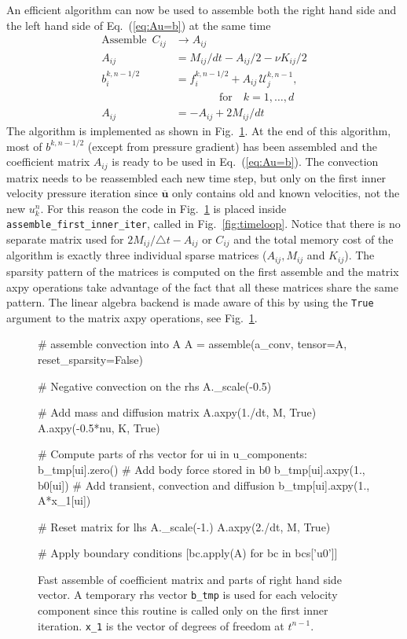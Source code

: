 \documentclass[final,3p,times,twocolumn]{elsarticle}
\newcommand{\inpyth}{\lstinline[style=inlinestyle]} %[]%
\begin{document}
An efficient algorithm can now be used to assemble both the right hand side and the left hand side of Eq.~(\ref{eq:Au=b}) at the same time
\begin{align*}
        \text{Assemble}\,\,\, C_{ij} &\longrightarrow A_{ij} \\
        A_{ij} &= M_{ij}/dt - A_{ij}/2-\nu K_{ij}/2 \\
        b_i^{k, n-1/2} &= f_i^{k, n-1/2} + A_{ij}\,\mathcal{U}_j^{k, n-1}, \\
        & \quad\quad\quad\quad \text{for}\quad k=1,\ldots, d \\
        A_{ij} &= -A_{ij} + 2M_{ij}/dt
\end{align*}
The algorithm is implemented as shown in Fig.~\ref{fig:assemble_first_inner_iter}. At the end of this algorithm, most of $b^{k, n-1/2}$ (except from pressure gradient) has been assembled and the coefficient matrix $A_{ij}$ is ready to be used in Eq.~(\ref{eq:Au=b}). The convection matrix needs to be reassembled each new time step, but only on the first inner velocity pressure iteration since $\overline{\bm{u}}$ only contains old and known velocities, not the new $u_k^{n}$. For this reason the code in Fig.~\ref{fig:assemble_first_inner_iter} is placed inside  \inpyth{assemble_first_inner_iter}, called in Fig.~\ref{fig:timeloop}. Notice that there is no separate matrix used for $2M_{ij}/\triangle t - A_{ij}$ or $C_{ij}$ and the total memory cost of the algorithm is exactly three individual sparse matrices ($A_{ij}, M_{ij}$ and $K_{ij}$). The sparsity pattern of the matrices is computed on the first assemble and the matrix axpy operations take advantage of the fact that all these matrices share the same pattern. The linear algebra backend is made aware of this by using the \inpyth{True} argument to the matrix axpy operations, see Fig.~\ref{fig:assemble_first_inner_iter}.
\begin{figure}
\begin{python}
# assemble convection into A
A = assemble(a_conv, tensor=A,
             reset_sparsity=False)

# Negative convection on the rhs
A._scale(-0.5)

# Add mass and diffusion matrix
A.axpy(1./dt, M, True)
A.axpy(-0.5*nu, K, True)

# Compute parts of rhs vector
for ui in u_components:
  b_tmp[ui].zero()
  # Add body force stored in b0
  b_tmp[ui].axpy(1., b0[ui])
  # Add transient, convection and diffusion
  b_tmp[ui].axpy(1., A*x_1[ui])

# Reset matrix for lhs
A._scale(-1.)
A.axpy(2./dt, M, True)

# Apply boundary conditions
[bc.apply(A) for bc in bcs['u0']]

\end{python}
\caption{Fast assemble of coefficient matrix and parts of right hand side vector. A temporary rhs vector \inpyth{b_tmp} is used for each velocity component since this routine is called only on the first inner iteration. \inpyth{x_1} is the vector of degrees of freedom at $t^{n-1}$.}
\label{fig:assemble_first_inner_iter}
\end{figure}
\end{document}

